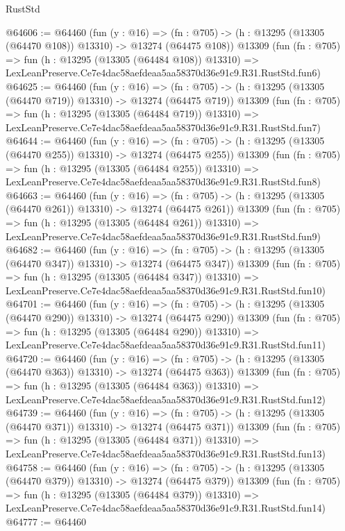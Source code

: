 \begin{lexlean}{RustStd}
\begin{coremodule}
@64606 := @64460
    (fun (y : @16) =>
    (fn : @705) -> (h : @13295 (@13305 (@64470 @108)) @13310) -> @13274 (@64475 @108))
    @13309
    (fun (fn : @705) =>
    fun (h : @13295 (@13305 (@64484 @108)) @13310) =>
    LexLeanPreserve.Ce7e4dac58aefdeaa5aa58370d36e91c9.R31.RustStd.fun6)
@64625 := @64460
    (fun (y : @16) =>
    (fn : @705) -> (h : @13295 (@13305 (@64470 @719)) @13310) -> @13274 (@64475 @719))
    @13309
    (fun (fn : @705) =>
    fun (h : @13295 (@13305 (@64484 @719)) @13310) =>
    LexLeanPreserve.Ce7e4dac58aefdeaa5aa58370d36e91c9.R31.RustStd.fun7)
@64644 := @64460
    (fun (y : @16) =>
    (fn : @705) -> (h : @13295 (@13305 (@64470 @255)) @13310) -> @13274 (@64475 @255))
    @13309
    (fun (fn : @705) =>
    fun (h : @13295 (@13305 (@64484 @255)) @13310) =>
    LexLeanPreserve.Ce7e4dac58aefdeaa5aa58370d36e91c9.R31.RustStd.fun8)
@64663 := @64460
    (fun (y : @16) =>
    (fn : @705) -> (h : @13295 (@13305 (@64470 @261)) @13310) -> @13274 (@64475 @261))
    @13309
    (fun (fn : @705) =>
    fun (h : @13295 (@13305 (@64484 @261)) @13310) =>
    LexLeanPreserve.Ce7e4dac58aefdeaa5aa58370d36e91c9.R31.RustStd.fun9)
@64682 := @64460
    (fun (y : @16) =>
    (fn : @705) -> (h : @13295 (@13305 (@64470 @347)) @13310) -> @13274 (@64475 @347))
    @13309
    (fun (fn : @705) =>
    fun (h : @13295 (@13305 (@64484 @347)) @13310) =>
    LexLeanPreserve.Ce7e4dac58aefdeaa5aa58370d36e91c9.R31.RustStd.fun10)
@64701 := @64460
    (fun (y : @16) =>
    (fn : @705) -> (h : @13295 (@13305 (@64470 @290)) @13310) -> @13274 (@64475 @290))
    @13309
    (fun (fn : @705) =>
    fun (h : @13295 (@13305 (@64484 @290)) @13310) =>
    LexLeanPreserve.Ce7e4dac58aefdeaa5aa58370d36e91c9.R31.RustStd.fun11)
@64720 := @64460
    (fun (y : @16) =>
    (fn : @705) -> (h : @13295 (@13305 (@64470 @363)) @13310) -> @13274 (@64475 @363))
    @13309
    (fun (fn : @705) =>
    fun (h : @13295 (@13305 (@64484 @363)) @13310) =>
    LexLeanPreserve.Ce7e4dac58aefdeaa5aa58370d36e91c9.R31.RustStd.fun12)
@64739 := @64460
    (fun (y : @16) =>
    (fn : @705) -> (h : @13295 (@13305 (@64470 @371)) @13310) -> @13274 (@64475 @371))
    @13309
    (fun (fn : @705) =>
    fun (h : @13295 (@13305 (@64484 @371)) @13310) =>
    LexLeanPreserve.Ce7e4dac58aefdeaa5aa58370d36e91c9.R31.RustStd.fun13)
@64758 := @64460
    (fun (y : @16) =>
    (fn : @705) -> (h : @13295 (@13305 (@64470 @379)) @13310) -> @13274 (@64475 @379))
    @13309
    (fun (fn : @705) =>
    fun (h : @13295 (@13305 (@64484 @379)) @13310) =>
    LexLeanPreserve.Ce7e4dac58aefdeaa5aa58370d36e91c9.R31.RustStd.fun14)
@64777 := @64460

\end{coremodule}
\end{lexlean}
